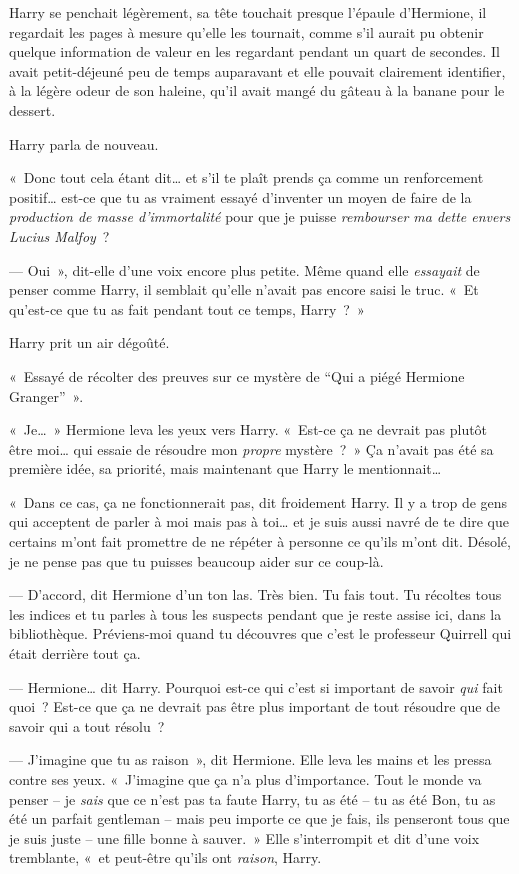 Harry se penchait légèrement, sa tête touchait presque l'épaule d'Hermione, il regardait les pages à mesure qu'elle les tournait, comme s'il aurait pu obtenir quelque information de valeur en les regardant pendant un quart de secondes. Il avait petit-déjeuné peu de temps auparavant et elle pouvait clairement identifier, à la légère odeur de son haleine, qu'il avait mangé du gâteau à la banane pour le dessert.

Harry parla de nouveau.

«~Donc tout cela étant dit… et s'il te plaît prends ça comme un renforcement positif… est-ce que tu as vraiment essayé d'inventer un moyen de faire de la \emph{production de masse d'immortalité} pour que je puisse \emph{rembourser ma dette envers Lucius Malfoy}~?

--- Oui~», dit-elle d'une voix encore plus petite. Même quand elle \emph{essayait} de penser comme Harry, il semblait qu'elle n'avait pas encore saisi le truc. «~Et qu'est-ce que tu as fait pendant tout ce temps, Harry~?~»

Harry prit un air dégoûté.

«~Essayé de récolter des preuves sur ce mystère de “Qui a piégé Hermione Granger”~».

«~Je…~» Hermione leva les yeux vers Harry. «~Est-ce ça ne devrait pas plutôt être moi… qui essaie de résoudre mon \emph{propre} mystère~?~» Ça n'avait pas été sa première idée, sa priorité, mais maintenant que Harry le mentionnait…

«~Dans ce cas, ça ne fonctionnerait pas, dit froidement Harry. Il y a trop de gens qui acceptent de parler à moi mais pas à toi… et je suis aussi navré de te dire que certains m'ont fait promettre de ne répéter à personne ce qu'ils m'ont dit. Désolé, je ne pense pas que tu puisses beaucoup aider sur ce coup-là.

--- D'accord, dit Hermione d'un ton las. Très bien. Tu fais tout. Tu récoltes tous les indices et tu parles à tous les suspects pendant que je reste assise ici, dans la bibliothèque. Préviens-moi quand tu découvres que c'est le professeur Quirrell qui était derrière tout ça.

--- Hermione… dit Harry. Pourquoi est-ce qui c'est si important de savoir \emph{qui} fait quoi~? Est-ce que ça ne devrait pas être plus important de tout résoudre que de savoir qui a tout résolu~?

--- J'imagine que tu as raison~», dit Hermione. Elle leva les mains et les pressa contre ses yeux. «~J'imagine que ça n'a plus d'importance. Tout le monde va penser -- je \emph{sais} que ce n'est pas ta faute Harry, tu as été -- tu as été Bon, tu as été un parfait gentleman -- mais peu importe ce que je fais, ils penseront tous que je suis juste -- une fille bonne à sauver.~» Elle s'interrompit et dit d'une voix tremblante, «~et peut-être qu'ils ont \emph{raison}, Harry.

